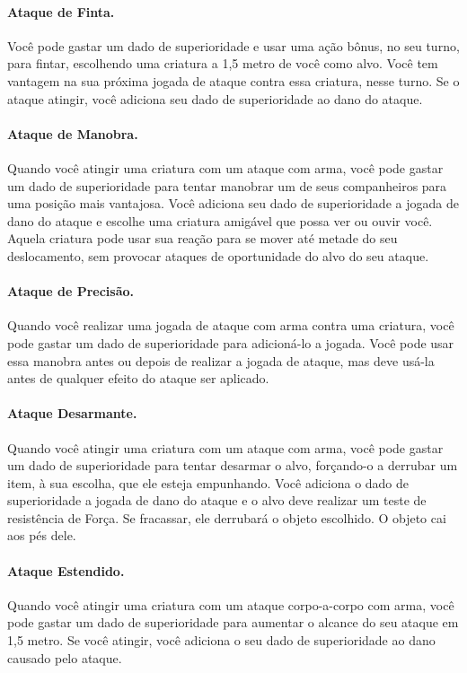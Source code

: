 \documentclass{RPG_Adventure}[2021/10/20]
\begin{document}
\begin{multicols}{2}
\paragraph{Ataque de Finta.} Você pode gastar um dado de superioridade e usar
uma ação bônus, no seu turno, para fintar, escolhendo uma criatura a 1,5 metro
de você como alvo. Você tem vantagem na sua próxima jogada de ataque contra essa
criatura, nesse turno. Se o ataque atingir, você adiciona seu dado de
superioridade ao dano do ataque.

\paragraph{Ataque de Manobra.} Quando você atingir uma criatura com um ataque
com arma, você pode gastar um dado de superioridade para tentar manobrar um de
seus companheiros para uma posição mais vantajosa. Você adiciona seu dado de
superioridade a jogada de dano do ataque e escolhe uma criatura amigável que
possa ver ou ouvir você. Aquela criatura pode usar sua reação para se mover até
metade do seu deslocamento, sem provocar ataques de oportunidade do alvo do seu
ataque.

\paragraph{Ataque de Precisão.} Quando você realizar uma jogada de ataque com
arma contra uma criatura, você pode gastar um dado de superioridade para
adicioná-lo a jogada. Você pode usar essa manobra antes ou depois de realizar a
jogada de ataque, mas deve usá-la antes de qualquer efeito do ataque ser
aplicado.

\paragraph{Ataque Desarmante.} Quando você atingir uma criatura com um ataque
com arma, você pode gastar um dado de superioridade para tentar desarmar o alvo,
forçando-o a derrubar um item, à sua escolha, que ele esteja empunhando. Você
adiciona o dado de superioridade a jogada de dano do ataque e o alvo deve
realizar um teste de resistência de Força. Se fracassar, ele derrubará o objeto
escolhido. O objeto cai aos pés dele.

\paragraph{Ataque Estendido.} Quando você atingir uma criatura com um ataque
corpo-a-corpo com arma, você pode gastar um dado de superioridade para aumentar
o alcance do seu ataque em 1,5 metro. Se você atingir, você adiciona o seu dado
de superioridade ao dano causado pelo ataque.


\end{multicols}
\end{document}
